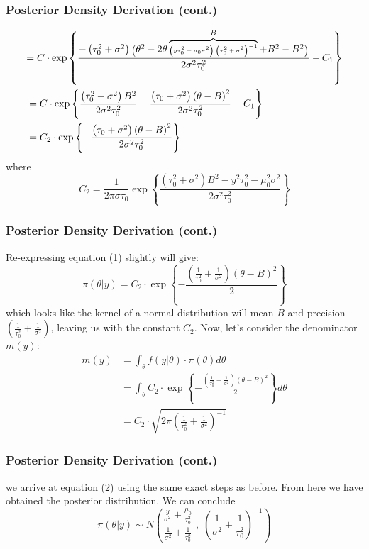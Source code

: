 \documentclass[10pt]{beamer}
\begin{document}
\begin{frame}
\frametitle{Posterior Density Derivation (cont.)}
	\begin{align}
		&{\tiny =C\cdot\exp\left\{\frac{-\left(\tau_0^2+\sigma^2\right)\bigg(\theta^2-2\theta\overbrace{\left(y\tau_0^2+\mu_0\sigma^2\right)\left(\tau_0^2+\sigma^2\right)^{-1}}^{B}+B^2-B^2\bigg)}{2\sigma^2\tau_0^2}-C_1\right\}}\nonumber\\
		&=C\cdot\exp\left\{\frac{\left(\tau_0^2+\sigma^2\right)B^2}{2\sigma^2\tau_0^2}-\frac{\left(\tau_0+\sigma^2\right)\left(\theta-B\right)^2}{2\sigma^2\tau_0^2}-C_1\right\}\nonumber\\
		&=C_2\cdot\exp\left\{-\frac{\left(\tau_0+\sigma^2\right)\left(\theta-B\right)^2}{2\sigma^2\tau_0^2}\right\}
	\end{align}
	where $$C_2=\frac{1}{2\pi\sigma\tau_0}\exp\left\{\frac{\left(\tau_0^2+\sigma^2\right)B^2-y^2\tau_0^2-\mu_0^2\sigma^2}{2\sigma^2\tau_0^2}\right\}$$
\end{frame}

\begin{frame}
\frametitle{Posterior Density Derivation (cont.)}
Re-expressing equation (1) slightly will give: $$\pi(\theta|y)=C_2\cdot\exp\left\{-\frac{\left(\frac{1}{\tau_0^2}+\frac{1}{\sigma^2}\right)\left(\theta-B\right)^2}{2}\right\}$$ which looks like the kernel of a normal distribution will mean $B$ and precision $\left(\frac{1}{\tau_0^2}+\frac{1}{\sigma^2}\right)$, leaving us with the constant $C_2$. Now, let's consider the denominator $m(y)$:
	\begin{align}
		m(y)&=\int_{\theta}f(y|\theta)\cdot\pi(\theta)d\theta\nonumber\\
		&=\int_{\theta}C_2\cdot\exp\left\{-\frac{\left(\frac{1}{\tau_0^2}+\frac{1}{\sigma^2}\right)\left(\theta-B\right)^2}{2}\right\}d\theta\\
		&=C_2\cdot\sqrt{2\pi\left(\frac{1}{\tau_0^2}+\frac{1}{\sigma^2}\right)^{-1}}\nonumber
	\end{align}
\end{frame}

\begin{frame}
\frametitle{Posterior Density Derivation (cont.)}
	we arrive at equation (2) using the same exact steps as before. From here we have obtained the posterior distribution. We can conclude $$\pi(\theta|y)\sim N\left(\frac{\frac{y}{\sigma^2}+\frac{\mu_0}{\tau_0^2}}{\frac{1}{\sigma^2}+\frac{1}{\tau_0^2}}\;,\;\left(\frac{1}{\sigma^2}+\frac{1}{\tau_0^2}\right)^{-1}\right)$$
\end{frame}
\end{document}
